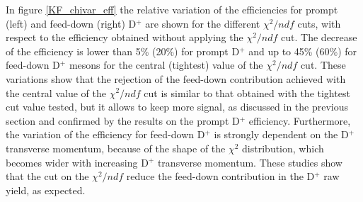 \documentclass[b5paper,10pt,twoside,oldstyle,classica]{toptesi}
\begin{document}
In figure \ref{KF_chivar_eff} the relative variation of the efficiencies for prompt (left) and feed-down (right) D$^+$ are shown for the different $\chi^2/ndf$ cuts, with respect to the efficiency obtained without applying the $\chi^2/ndf$ cut. The decrease of the efficiency is lower than 5\% (20\%) for prompt D$^+$ and up to 45\% (60\%) for feed-down D$^+$ mesons for the central (tightest) value of the $\chi^2/ndf$ cut. These variations show that the rejection of the feed-down contribution achieved with the central value of the $\chi^2/ndf$ cut is similar to that obtained with the tightest cut value tested, but it allows to keep more signal, as discussed in the previous section and confirmed by the results on the prompt D$^+$ efficiency. Furthermore, the variation of the efficiency for feed-down D$^+$ is strongly dependent on the D$^+$ transverse momentum, because of the shape of the $\chi^2$ distribution, which becomes wider with increasing D$^+$ transverse momentum. These studies show that the cut on the $\chi^2/ndf$ reduce the feed-down contribution in the D$^+$ raw yield, as expected.
\end{document}
